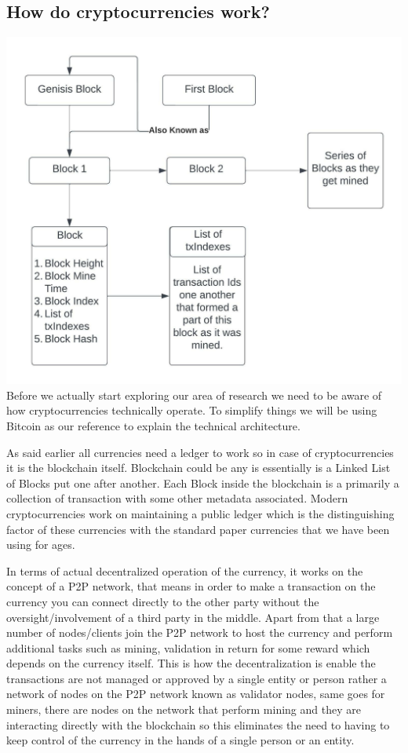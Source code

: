 \documentclass{article}
\begin{document}
\subsection{How do cryptocurrencies work?}
\includegraphics[]{Simple Blockchain.jpeg}
Before we actually start exploring our area of research we need to be aware of how cryptocurrencies technically operate. To simplify things we will be using Bitcoin as our reference to explain the technical architecture.

As said earlier all currencies need a ledger to work so in case of cryptocurrencies it is the blockchain itself. Blockchain could be any is essentially is a Linked List \cite{} of Blocks put one after another. Each Block inside the blockchain is a primarily a collection of transaction with some other metadata associated. Modern cryptocurrencies work on maintaining a public ledger which is the distinguishing factor of these currencies with the standard paper currencies that we have been using for ages. 

In terms of actual decentralized operation of the currency, it works on the concept of a P2P network, that means in order to make a transaction on the currency you can connect directly to the other party without the oversight/involvement of a third party in the middle. Apart from that a large number of nodes/clients join the P2P network to host the currency and perform additional tasks such as mining, validation in return for some reward which depends on the currency itself. This is how the decentralization is enable the transactions are not managed or approved by a single entity or person rather a network of nodes on the P2P network known as validator nodes, same goes for miners, there are nodes on the network that perform mining and they are interacting directly with the blockchain so this eliminates the need to having to keep control of the currency in the hands of a single person or an entity.
\end{document}
